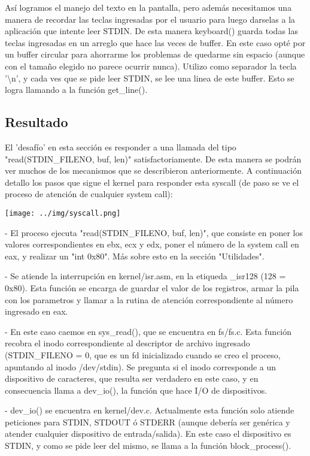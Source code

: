 Así logramos el manejo del texto en la pantalla, pero además necesitamos una
manera de recordar las teclas ingresadas por el usuario para luego darselas a
la aplicación que intente leer STDIN. De esta manera keyboard() guarda todas
las teclas ingresadas en un arreglo que hace las veces de buffer. En este caso
opté por un buffer circular para ahorrarme los problemas de quedarme sin
espacio (aunque con el tamaño elegido no parece ocurrir nunca). Utilizo como
separador la tecla '\textbackslash n', y cada ves que se pide leer STDIN, se
lee una linea de este buffer. Esto se logra llamando a la función get\_line().

\subsection{Resultado}

El 'desafío' en esta sección es responder a una llamada del tipo
"read(STDIN\_FILENO, buf, len)" satisfactoriamente. De esta manera se podrán
ver muchos de los mecanismos que se describieron anteriormente. A continuación
detallo los pasos que sigue el kernel para responder esta syscall (de paso se
ve el proceso de atención de cualquier system call):


\begin{center}
\texttt{[image: ../img/syscall.png]}
\end{center}


- El proceso ejecuta "read(STDIN\_FILENO, buf, len)", que consiste en poner los
valores correspondientes en ebx, ecx y edx, poner el número de la system call
en eax, y realizar un "int 0x80". Más sobre esto en la sección "Utilidades".

- Se atiende la interrupción en kernel/isr.asm, en la etiqueda \_isr128 (128
= 0x80). Esta función se encarga de guardar el valor de los registros, armar
la pila con los parametros y llamar a la rutina de atención correspondiente
al número ingresado en eax.

- En este caso caemos en sys\_read(), que se encuentra en fs/fs.c. Esta función
recobra el inodo correspondiente al descriptor de archivo ingresado
(STDIN\_FILENO = 0, que es un fd inicializado cuando se creo el proceso,
apuntando al inodo /dev/stdin). Se pregunta si el inodo corresponde a un
dispositivo de caracteres, que resulta ser verdadero en este caso, y en
consecuencia llama a dev\_io(), la función que hace I/O de dispositivos.

- dev\_io() se encuentra en kernel/dev.c. Actualmente esta función solo atiende
peticiones para STDIN, STDOUT ó STDERR (aunque debería ser genérica y atender
cualquier dispositivo de entrada/salida). En este caso el dispositivo es STDIN,
y como se pide leer del mismo, se llama a la función block\_process().

